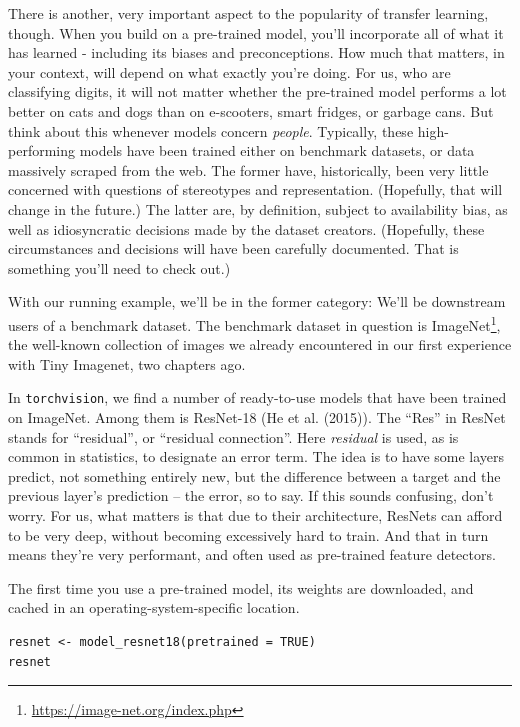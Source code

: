 \documentclass[
  letterpaper,
]{krantz}
\DeclareRobustCommand{\href}[2]{#2\footnote{\url{#1}}}
\begin{document}
There is another, very important aspect to the popularity of transfer
learning, though. When you build on a pre-trained model, you'll
incorporate all of what it has learned - including its biases and
preconceptions. How much that matters, in your context, will depend on
what exactly you're doing. For us, who are classifying digits, it will
not matter whether the pre-trained model performs a lot better on cats
and dogs than on e-scooters, smart fridges, or garbage cans. But think
about this whenever models concern \emph{people}. Typically, these
high-performing models have been trained either on benchmark datasets,
or data massively scraped from the web. The former have, historically,
been very little concerned with questions of stereotypes and
representation. (Hopefully, that will change in the future.) The latter
are, by definition, subject to availability bias, as well as
idiosyncratic decisions made by the dataset creators. (Hopefully, these
circumstances and decisions will have been carefully documented. That is
something you'll need to check out.)

With our running example, we'll be in the former category: We'll be
downstream users of a benchmark dataset. The benchmark dataset in
question is \href{https://image-net.org/index.php}{ImageNet}, the
well-known collection of images we already encountered in our first
experience with Tiny Imagenet, two chapters ago.

In \texttt{torchvision}, we find a number of ready-to-use models that
have been trained on ImageNet. Among them is ResNet-18 (He et al.
(2015)). The ``Res'' in ResNet stands for ``residual'', or ``residual
connection''. Here \emph{residual} is used, as is common in statistics,
to designate an error term. The idea is to have some layers predict, not
something entirely new, but the difference between a target and the
previous layer's prediction -- the error, so to say. If this sounds
confusing, don't worry. For us, what matters is that due to their
architecture, ResNets can afford to be very deep, without becoming
excessively hard to train. And that in turn means they're very
performant, and often used as pre-trained feature detectors.

The first time you use a pre-trained model, its weights are downloaded,
and cached in an operating-system-specific location.

\begin{verbatim}
resnet <- model_resnet18(pretrained = TRUE)
resnet
\end{verbatim}
\end{document}

